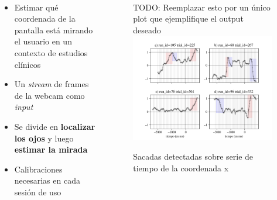 \documentclass[aspectratio=169]{beamer}
\begin{document}
\begin{frame}{~}
  \begin{columns}
    \begin{column}{0.5\textwidth}
      \begin{itemize}
        \item Estimar qué coordenada de la pantalla está mirando el usuario en
          un contexto de estudios clínicos
        \item Un \textit{stream} de frames de la webcam como \textit{input}
        \item Se divide en \textbf{localizar los ojos} y luego \textbf{estimar
          la mirada}
        \item Calibraciones necesarias en cada sesión de uso
      \end{itemize}
    \end{column}
    \begin{column}{0.5\textwidth}
      \begin{figure}
        \centering
        TODO: Reemplazar esto por un único plot que ejemplifique el output
        deseado
        \includegraphics[width=\linewidth]{img/eye-tracking-output-example.png}
        \caption{Sacadas detectadas sobre serie de tiempo de la coordenada x}
      \end{figure}
    \end{column}
  \end{columns}
\end{frame}
\end{document}
